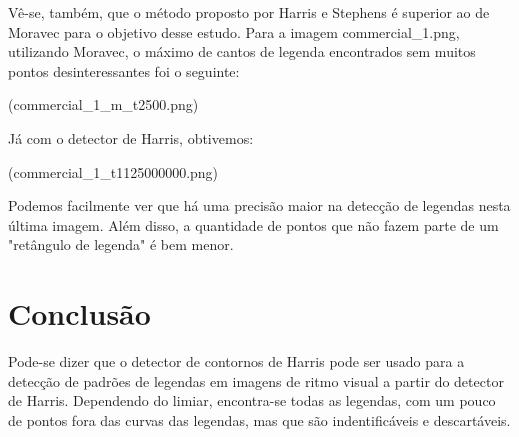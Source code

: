 \documentclass[10pt,a4paper]{article}
\begin{document}
Vê-se, também, que o método proposto por Harris e Stephens é superior ao de
Moravec para o objetivo desse estudo. Para a imagem commercial_1.png, utilizando
Moravec, o máximo de cantos de legenda encontrados sem muitos pontos
desinteressantes foi o seguinte:

(commercial_1_m_t2500.png)

Já com o detector de Harris, obtivemos:

(commercial_1_t1125000000.png)

Podemos facilmente ver que há uma precisão maior na detecção de legendas nesta
última imagem. Além disso, a quantidade de pontos que não fazem parte de um
"retângulo de legenda" é bem menor.

\newpage
\section{Conclusão}
Pode-se dizer que o detector de contornos de Harris pode 
ser usado para a detecção de padrões de legendas em imagens de ritmo visual a
partir do detector de Harris.
Dependendo do limiar, encontra-se todas as legendas, com um pouco de
pontos fora das curvas das legendas, mas que são indentificáveis e descartáveis.


\begin{small}
  
\end{small}
\end{document}
